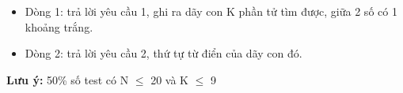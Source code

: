\begin{itemize}
	\item 

     Dòng 1: trả lời yêu cầu 1, ghi ra dãy con K phần tử tìm được, giữa 2 số có 1 khoảng trắng.    
	\item     Dòng 2: trả lời yêu cầu 2, thứ tự từ điển của dãy con đó.   
\end{itemize}

\textbf{    Lưu ý:   }   50\% số test có N $\le$ 20 và K $\le$ 9  
\begin{itemize}
\end{itemize}

\